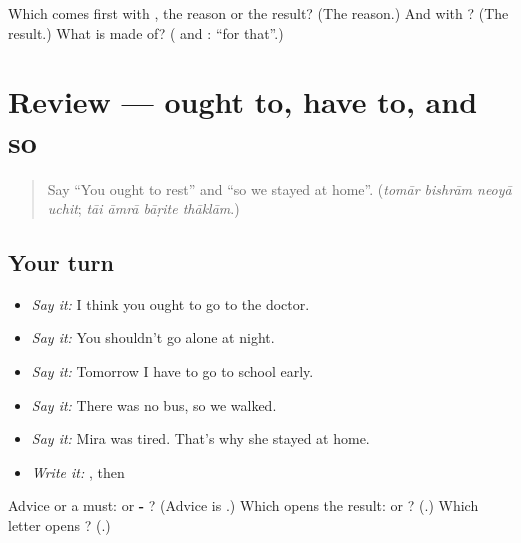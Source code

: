 \begin{tcolorbox}[breakable,colback=teal!4,colframe=teal!35!black,title={Before you move on}]
Which comes first with \textbf{}, the reason or the result? (The reason.) And with \textbf{}? (The result.) What is \textbf{} made of? (\textbf{} and \textbf{}: \textquotedblleft{}for that\textquotedblright{}.)
\end{tcolorbox}
\section[(review)]{Review — ought to, have to, and so}

\label{lesson:BN-R269-advice-and-result}



\begin{quote}
Say \textquotedblleft{}You ought to rest\textquotedblright{} and \textquotedblleft{}so we stayed at home\textquotedblright{}. (\emph{tomār bishrām neoyā uchit}; \emph{tāi āmrā bāṛite thāklām}.)
\end{quote}

\subsection*{Your turn}
\begin{itemize}
\raggedright
  \item \emph{Say it:} I think you ought to go to the doctor.
  \item \emph{Say it:} You shouldn't go alone at night.
  \item \emph{Say it:} Tomorrow I have to go to school early.
  \item \emph{Say it:} There was no bus, so we walked.
  \item \emph{Say it:} Mira was tired. That's why she stayed at home.
  \item \emph{Write it:} \textbf{}, then \textbf{}
\end{itemize}

\begin{tcolorbox}[breakable,colback=teal!4,colframe=teal!35!black,title={Before you move on}]
Advice or a must: \textbf{} or \textbf{- }? (Advice is \textbf{}.) Which opens the result: \textbf{} or \textbf{}? (\textbf{}.) Which letter opens \textbf{}? (\textbf{}.)
\end{tcolorbox}
